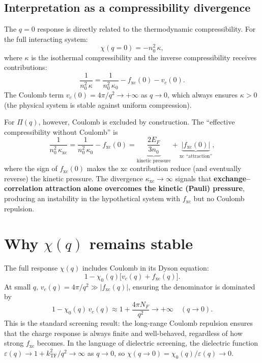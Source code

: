 \documentclass[aps,prb,twocolumn,superscriptaddress,floatfix]{revtex4-2}
\begin{document}
\subsection{Interpretation as a compressibility divergence}

The $q = 0$ response is directly related to the thermodynamic compressibility.
For the full interacting system:
\begin{equation}
    \chi(q{=}0) = -n_0^2\,\kappa,
\end{equation}
where $\kappa$ is the isothermal compressibility and the inverse
compressibility receives contributions:
\begin{equation}
    \frac{1}{n_0^2\,\kappa}
    = \frac{1}{n_0^2\,\kappa_0}
    - f_{\mathrm{xc}}(0)
    - v_c(0).
\end{equation}
The Coulomb term $v_c(0) = 4\pi/q^2 \to +\infty$ as $q \to 0$,
which always ensures $\kappa > 0$ (the physical system is stable against
uniform compression).

For $\Pi(q)$, however, Coulomb is excluded by construction.
The ``effective compressibility without Coulomb'' is
\begin{equation}
    \frac{1}{n_0^2\,\kappa_{\mathrm{xc}}}
    = \frac{1}{n_0^2\,\kappa_0} - f_{\mathrm{xc}}(0)
    = \underbrace{\frac{2E_F}{3n_0}}_{\text{kinetic pressure}}
    + \underbrace{|f_{\mathrm{xc}}(0)|}_{\text{xc ``attraction''}},
    \label{eq:kappa_xc}
\end{equation}
where the sign of $f_{\mathrm{xc}}(0)$ makes the xc contribution
reduce (and eventually reverse) the kinetic pressure.
The divergence $\kappa_{\mathrm{xc}} \to \infty$ signals that
\textbf{exchange--correlation attraction alone overcomes the kinetic (Pauli)
    pressure}, producing an instability in the hypothetical system with $f_{\mathrm{xc}}$
but no Coulomb repulsion.

\section{Why $\chi(q)$ remains stable}
\label{sec:chi_stable}

The full response $\chi(q)$ includes Coulomb in its Dyson equation:
\begin{equation}
    1 - \chi_0(q)\bigl[v_c(q) + f_{\mathrm{xc}}(q)\bigr].
\end{equation}
At small $q$, $v_c(q) = 4\pi/q^2 \gg |f_{\mathrm{xc}}(q)|$, ensuring the
denominator is dominated by
\begin{equation}
    1 - \chi_0(q)\,v_c(q) \approx 1 + \frac{4\pi N_F}{q^2} \to +\infty
    \quad (q \to 0).
\end{equation}
This is the standard screening result: the long-range Coulomb repulsion
ensures that the charge response is always finite and well-behaved,
regardless of how strong $f_{\mathrm{xc}}$ becomes.
In the language of dielectric screening, the dielectric function
$\varepsilon(q) \to 1 + k_{\mathrm{TF}}^2/q^2 \to \infty$ as $q \to 0$,
so $\chi(q \to 0) = \chi_0(q)/\varepsilon(q) \to 0$.
\end{document}
